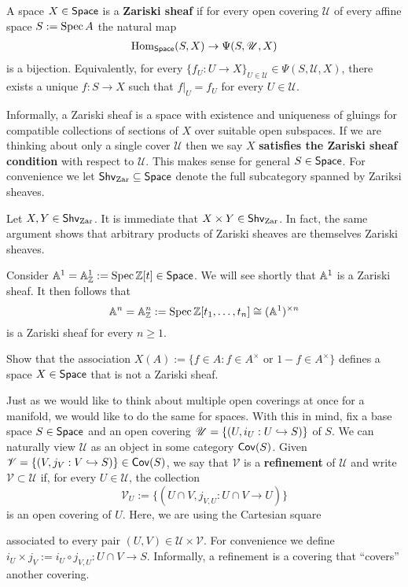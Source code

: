 \documentclass[11pt]{article}
\newcommand{\U}{\mathscr{U}}
\newcommand{\V}{\mathscr{V}}
\begin{document}
\begin{definition}
A space $X\in\operatorname{\mathsf{Space}}$ is a \textbf{Zariski sheaf} if for every open covering $\U$ of every affine space $S:=\operatorname{Spec} A$ the natural map 
\begin{align*}
\Hom_{\Space}(S,X)\to\Psi(S,\U,X)
\end{align*}
is a bijection. Equivalently, for every $\{f_U: U\to X\}_{U\in\U}\in\Psi(S,\U,X)$, there exists a unique $f: S\to X$ such that $f|_U=f_U$ for every $U\in\U$.
\end{definition}

Informally, a Zariski sheaf is a space with existence and uniqueness of gluings for compatible collections of sections of $X$ over suitable open subspaces. If we are thinking about only a single cover $\U$ then we say $X$ \textbf{satisfies the Zariski sheaf condition} with respect to $\U$. This makes sense for general $S\in\operatorname{\mathsf{Space}}$. For convenience we let $\operatorname{\mathsf{Shv}}_{\operatorname{Zar}}\subseteq\operatorname{\mathsf{Space}}$ denote the full subcategory spanned by Zariksi sheaves. 

\begin{example}
Let $X,Y\in\operatorname{\mathsf{Shv}}_{\operatorname{Zar}}$. It is immediate that $X\times Y\in\operatorname{\mathsf{Shv}}_{\operatorname{Zar}}$. In fact, the same argument shows that arbitrary products of Zariski sheaves are themselves Zariski sheaves. 
\end{example}

\begin{example}
Consider $\mathbb{A}^1=\mathbb{A}_{\mathbb{Z}}^1:=\operatorname{Spec}\mathbb{Z}[t]\in\operatorname{\mathsf{Space}}$. We will see shortly that $\mathbb{A}^1$ is a Zariski sheaf. It then follows that 
$$\mathbb{A}^n=\mathbb{A}_{\mathbb{Z}}^n:=\operatorname{Spec}\mathbb{Z}[t_1,\ldots,t_n]\cong(\mathbb{A}^1)^{\times n}$$ 
is a Zariski sheaf for every $n\geq1$.
\end{example}

\begin{exercise}
Show that the association $X(A):=\{f\in A : f\in A^{\times}\textrm{ or }1-f\in A^{\times}\}$ defines a space $X\in\operatorname{\mathsf{Space}}$ that is not a Zariski sheaf.
\end{exercise}

Just as we would like to think about multiple open coverings at once for a manifold, we would like to do the same for spaces. With this in mind, fix a base space $S\in\operatorname{\mathsf{Space}}$ and an open covering $\U=\{(U,i_U: U\inj S)\}$ of $S$. We can naturally view $\U$ as an object in some category $\operatorname{\mathsf{Cov}}(S)$. Given $\V=\{(V,j_V: V\inj S)\}\in\Cov(S)$, we say that $\V$ is a \textbf{refinement} of $\U$ and write $\V\subset\U$ if, for every $U\in\U$, the collection
$$\V_U:=\{(U\cap V,j_{V,U}: U\cap V\to U)\}$$
is an open covering of $U$. Here, we are using the Cartesian square
\begin{center}
\end{center}
associated to every pair $(U,V)\in\U\times\V$. For convenience we define $i_U\times j_V:=i_U\circ j_{V,U}: U\cap V\to S$. Informally, a refinement is a covering that ``covers'' another covering.
\end{document}
